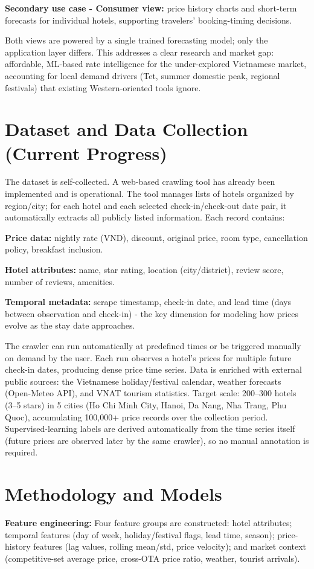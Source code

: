 \documentclass[11pt,a4paper]{article}
\newcommand{\entry}[1]{\par\hspace*{1.5em}#1}
\begin{document}
\entry{\textbf{Secondary use case - Consumer view:} price history charts and
short-term forecasts for individual hotels, supporting travelers'
booking-timing decisions.}

Both views are powered by a single trained forecasting model; only the
application layer differs. This addresses a clear research and market gap:
affordable, ML-based rate intelligence for the under-explored Vietnamese
market, accounting for local demand drivers (Tet, summer domestic peak,
regional festivals) that existing Western-oriented tools ignore.

\section{Dataset and Data Collection (Current Progress)}
The dataset is self-collected. A web-based crawling tool has already been
implemented and is operational. The tool manages lists of hotels organized by
region/city; for each hotel and each selected check-in/check-out date pair,
it automatically extracts all publicly listed information. Each record
contains:

\entry{\textbf{Price data:} nightly rate (VND), discount, original price, room
type, cancellation policy, breakfast inclusion.}

\entry{\textbf{Hotel attributes:} name, star rating, location (city/district),
review score, number of reviews, amenities.}

\entry{\textbf{Temporal metadata:} scrape timestamp, check-in date, and lead
time (days between observation and check-in) - the key dimension for
modeling how prices evolve as the stay date approaches.}

The crawler can run automatically at predefined times or be triggered
manually on demand by the user. Each run observes a hotel's prices for
multiple future check-in dates, producing dense price time series. Data is
enriched with external public sources: the Vietnamese holiday/festival
calendar, weather forecasts (Open-Meteo API), and VNAT tourism statistics.
Target scale: 200--300 hotels (3--5 stars) in 5 cities (Ho Chi Minh City,
Hanoi, Da Nang, Nha Trang, Phu Quoc), accumulating 100{,}000+ price records
over the collection period. Supervised-learning labels are derived
automatically from the time series itself (future prices are observed later
by the same crawler), so no manual annotation is required.

\section{Methodology and Models}
\entry{\textbf{Feature engineering:} Four feature groups are constructed: hotel
attributes; temporal features (day of week, holiday/festival flags, lead
time, season); price-history features (lag values, rolling mean/std, price
velocity); and market context (competitive-set average price, cross-OTA
price ratio, weather, tourist arrivals).}
\end{document}
